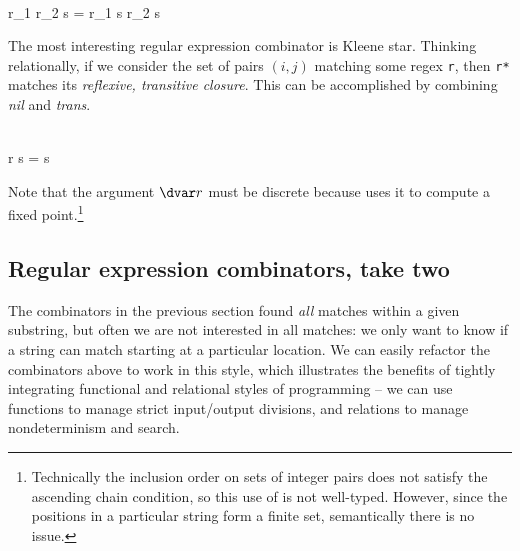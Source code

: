 \begin{code}
   \isa \tre \to \tre \to \tre\\
   \<\mvar r_1 \<\mvar r_2  \<\mvar s = \mvar r_1 \<\mvar s \vee \mvar r_2 \<\mvar s
\end{code}

\noindent
The most interesting regular expression combinator is Kleene star. Thinking
relationally, if we consider the set of pairs $(i,j)$ matching some regex
\texttt{r}, then \texttt{r*} matches its \emph{reflexive, transitive closure}.
This can be accomplished by combining \emph{nil} and \emph{trans}.

\begin{code}
   \isa \iso\tre \to \tre\\
   \<\pboxvar r \<\pboxvar s =
  \<\eboxvar s \vee
   \<
\end{code}

\noindent
Note that the argument $\dvar r$ must be discrete because  uses it
to compute a fixed point.\footnote{Technically the inclusion order on sets of
  integer pairs does not satisfy the ascending chain condition, so this use
  of  is not well-typed. However, since the positions in a
  particular string form a finite set, semantically there is no issue.
  }



\subsection{Regular expression combinators, take two}
\label{regex-combinators-take-two}

\newcommand\kernj{\kern1pt j}
\renewcommand\kernj{j}



The combinators in the previous section found \emph{all} matches
within a given substring, but often we are not interested in all
matches: we only want to know if a string can match starting at a
particular location. We can easily refactor the combinators above to
work in this style, which illustrates the benefits of tightly
integrating functional and relational styles of programming -- we can
use functions to manage strict input/output divisions, and relations
to manage nondeterminism and search.

